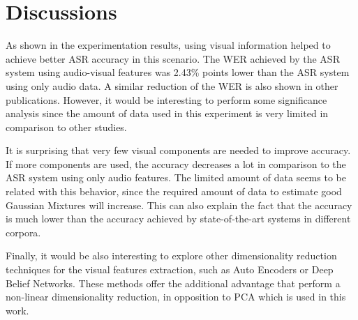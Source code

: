 \documentclass[12pt,a4paper]{article}
\begin{document}
\section{Discussions}
As shown in the experimentation results, using visual information helped to achieve better ASR accuracy in this scenario. The WER achieved by the ASR system using audio-visual features was 2.43\% points lower than the ASR system using only audio data. A similar reduction of the WER is also shown in other publications\cite{neti2000audio, dupont2000audio, hazen2004segment}. However, it would be interesting to perform some significance analysis since the amount of data used in this experiment is very limited in comparison to other studies.

It is surprising that very few visual components are needed to improve accuracy. If more components are used, the accuracy decreases a lot in comparison to the ASR system using only audio features. The limited amount of data seems to be related with this behavior, since the required amount of data to estimate good Gaussian Mixtures will increase. This can also explain the fact that the accuracy is much lower than the accuracy achieved by state-of-the-art systems in different corpora.

Finally, it would be also interesting to explore other dimensionality reduction techniques for the visual features extraction, such as Auto Encoders or Deep Belief Networks\cite{hinton2006reducing}. These methods offer the additional advantage that perform a non-linear dimensionality reduction, in opposition to PCA which is used in this work.

 

\end{document}
